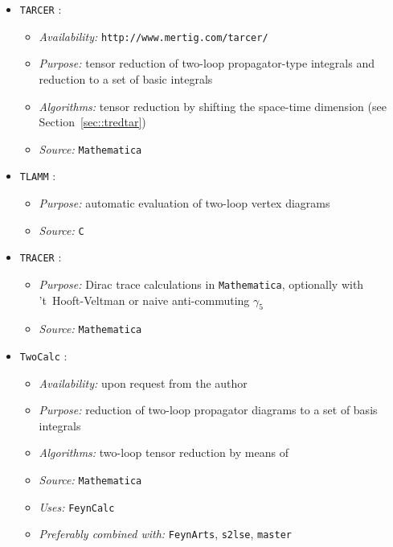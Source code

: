\begin{itemize}

\item {\tt TARCER} \cite{MerSch98}:
  \begin{itemize}
  \item {\it Availability:} {\tt http://www.mertig.com/tarcer/}
  \item{\it Purpose:} tensor reduction of two-loop propagator-type
    integrals and reduction to a set of basic integrals
  \item {\it Algorithms:} tensor reduction by shifting the space-time
      dimension (see Section~\ref{sec::tredtar})
  \item {\it Source:} {\tt Mathematica}
  \end{itemize}


\item {\tt TLAMM} \cite{tlamm}:
  \begin{itemize}
  \item{\it Purpose:} automatic evaluation of two-loop vertex diagrams
  \item{\it Source:} {\tt C}
  \end{itemize}


\item {\tt TRACER} \cite{tracer}:
  \begin{itemize}
  \item{\it Purpose:} Dirac trace calculations in {\tt Mathematica},
    optionally with 't~Hooft-Veltman or naive anti-commuting $\gamma_5$
  \item {\it Source:} {\tt Mathematica}
  \end{itemize}


\item {\tt TwoCalc} \cite{WeiSchBoe94}:
  \begin{itemize}
  \item{\it Availability:} upon request from the author
  \item{\it Purpose:} reduction of two-loop propagator diagrams to 
    a set of basis integrals
  \item{\it Algorithms:} two-loop tensor reduction by means of
    \cite{WeiSchBoe94}
  \item{\it Source:} {\tt Mathematica}
  \item{\it Uses:} {\tt FeynCalc}
  \item{\it Preferably combined with:}  {\tt FeynArts}, {\tt s2lse},
    {\tt master}
  \end{itemize}


\end{itemize}
